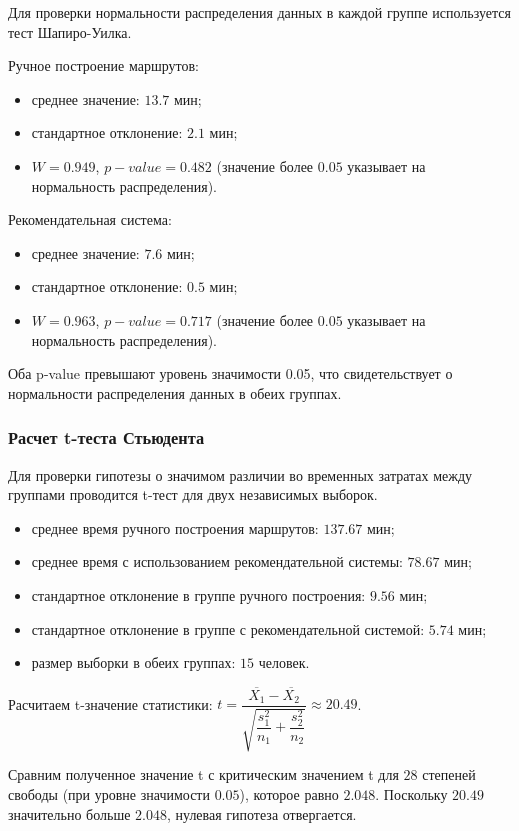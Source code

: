 Для проверки нормальности распределения данных в каждой группе используется тест Шапиро-Уилка.

Ручное построение маршрутов:
\begin{itemize}
\item среднее значение: $13.7$ мин;
\item стандартное отклонение: $2.1$ мин;
\item $W = 0.949$, $p-value = 0.482$ (значение более $0.05$ указывает на нормальность распределения).
\end{itemize}

Рекомендательная система:
\begin{itemize}
\item среднее значение: $7.6$ мин;
\item стандартное отклонение: $0.5$ мин;
\item $W = 0.963$, $p-value = 0.717$ (значение более $0.05$ указывает на нормальность распределения).
\end{itemize}

Оба p-value превышают уровень значимости 0.05, что свидетельствует о нормальности распределения данных в обеих группах.


\subsubsection{Расчет t-теста Стьюдента}

Для проверки гипотезы о значимом различии во временных затратах между группами проводится t-тест для двух независимых выборок.

\begin{itemize}
\item среднее время ручного построения маршрутов: $137.67$ мин;
\item среднее время с использованием рекомендательной системы: $78.67$ мин;
\item стандартное отклонение в группе ручного построения: $9.56$ мин;
\item стандартное отклонение в группе с рекомендательной системой: $5.74$ мин;
\item размер выборки в обеих группах: $15$ человек.
\end{itemize}

Расчитаем t-значение статистики: $t = \dfrac{\overline{X_1} - \overline{X_2}}{\sqrt{\dfrac{s_1^2}{n_1} + \dfrac{s_2^2}{n_2}}} \approx 20.49$.

Сравним полученное значение t с критическим значением t для $28$ степеней свободы (при уровне значимости $0.05$), которое равно $2.048$. Поскольку $20.49$ значительно больше $2.048$, нулевая гипотеза отвергается.

